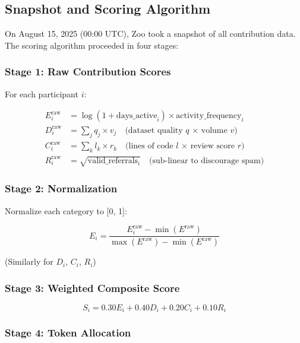 \documentclass[11pt,letterpaper]{article}
\theoremstyle{definition}
\theoremstyle{remark}
\begin{document}
\subsection{Snapshot and Scoring Algorithm}

On August 15, 2025 (00:00 UTC), Zoo took a snapshot of all contribution data. The scoring algorithm proceeded in four stages:

\subsubsection{Stage 1: Raw Contribution Scores}

For each participant $i$:

\begin{align}
E_i^{\text{raw}} &= \log(1 + \text{days\_active}_i) \times \text{activity\_frequency}_i \\
D_i^{\text{raw}} &= \sum_{j} q_j \times v_j \quad \text{(dataset quality $q$ × volume $v$)} \\
C_i^{\text{raw}} &= \sum_{k} l_k \times r_k \quad \text{(lines of code $l$ × review score $r$)} \\
R_i^{\text{raw}} &= \sqrt{\text{valid\_referrals}_i} \quad \text{(sub-linear to discourage spam)}
\end{align}

\subsubsection{Stage 2: Normalization}

Normalize each category to [0, 1]:

\begin{equation}
E_i = \frac{E_i^{\text{raw}} - \min(E^{\text{raw}})}{\max(E^{\text{raw}}) - \min(E^{\text{raw}})}
\end{equation}

(Similarly for $D_i$, $C_i$, $R_i$)

\subsubsection{Stage 3: Weighted Composite Score}

\begin{equation}
S_i = 0.30 E_i + 0.40 D_i + 0.20 C_i + 0.10 R_i
\end{equation}

\subsubsection{Stage 4: Token Allocation}
\end{document}
